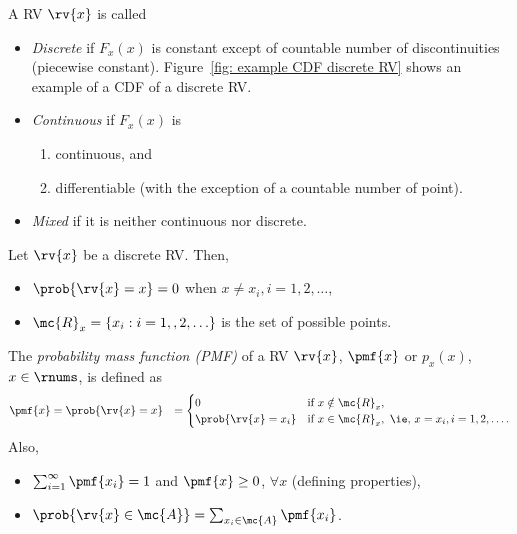\begin{mydefinition}
  A RV $\rv{x}$ is called 
  \begin{itemize}
      \item \emph{Discrete} if $F_{x}(x)$ is constant except of countable number of discontinuities (piecewise constant). Figure~\ref{fig: example CDF discrete RV} shows an example of a CDF of a discrete RV.
      \item \emph{Continuous} if $F_{x}(x)$ is
      \begin{enumerate}
          \item continuous, and
          \item differentiable (with the exception of a countable number of point).
      \end{enumerate}
      \item \emph{Mixed} if it is neither continuous nor discrete.
  \end{itemize}
\end{mydefinition}

\begin{mydefinition}
  Let $\rv{x}$ be a discrete RV. Then,
  \begin{itemize}
      \item $\prob{\rv{x}=x}=0$ when $x\neq x_{i}, i=1,2,\ldots$, 
      \item $\mc{R}_{x}=\left\{ x_{i} : i=1,,2,\ldots\right\}$ is the set of possible points. 
  \end{itemize}

  The \emph{probability mass function (PMF)} of a RV $\rv{x}$, $\pmf{x}$ or $p_{x}(x)$, $x\in\rnums$, is defined as 
  \begin{align}
      \pmf{x} &= \prob{\rv{x}=x} &= 
      \begin{cases}
          0 & \text{if } x\notin \mc{R}_{x},\\
          \prob{\rv{x}=x_{i}} & \text{if } x\in\mc{R}_{x}, \text{ \ie, } x=x_{i}, i=1,2,\ldots.
      \end{cases}
  \end{align}
  Also,
  \begin{itemize}
      \item $\sum_{i=1}^{\infty}\pmf{x_{i}} = 1$ and $\pmf{x}\geq 0$, $\forall x$ (defining properties),
      \item $\prob{\rv{x}\in \mc{A}}=\sum_{x_{i}\in \mc{A}} \pmf{x_{i}}$.
  \end{itemize}
\end{mydefinition}

